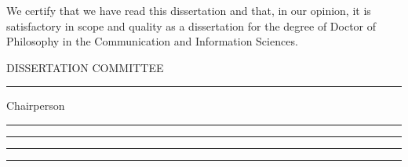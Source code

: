 
%

\newpage

\par\vspace*{1.0in}


\noindent We certify that we have read this dissertation and that, in our
opinion, it is satisfactory in scope and quality as a dissertation for the
degree of Doctor of Philosophy in the Communication and Information
Sciences.

\vspace*{0.8in}

\begin{flushright}

DISSERTATION COMMITTEE

\vspace{0.2in}

\rule{2.2in}{.01in}

\end{flushright}

\hspace{3.7in} Chairperson

\begin{flushright}
\rule{2.2in}{.01in}
\end{flushright}

\begin{flushright}
\vspace{0.15in}
\rule{2.2in}{.01in}

\vspace{0.3in}
\rule{2.2in}{.01in}

\vspace{0.3in}
\rule{2.2in}{.01in}
\end{flushright}
\vfill


%
